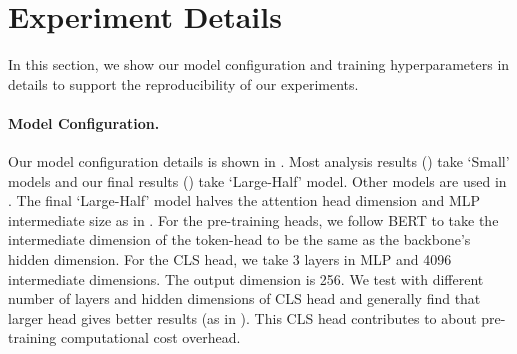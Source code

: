 \section{Experiment Details}
\label{sec:appen_experiment}
In this section, we show our model configuration and training hyperparameters in details to support the reproducibility of our experiments.

\paragraph{Model Configuration.} Our model configuration details is shown in . Most analysis results () take `Small'  models and our final results () take `Large-Half' model. Other models are used in . The final `Large-Half' model halves the attention head dimension and MLP intermediate size as in \cite{child2019generating}. 
For the pre-training heads, we follow BERT to take the intermediate dimension of the token-head to be the same as the backbone's hidden dimension.
For the CLS head, we take 3 layers in MLP and 4096 intermediate dimensions. 
The output dimension is 256.
We test with different number of layers and hidden dimensions of CLS head and generally find that larger head gives better results (as in \cite{qian2020spatiotemporal, chen2021mocov3}).
This CLS head contributes to about  pre-training computational cost overhead.


